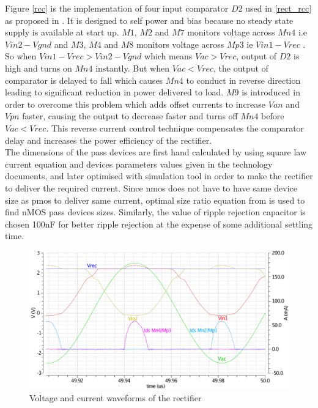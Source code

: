 \documentclass[12pt,a4paper,UKenglish]{article}
\begin{document}
Figure \ref{rcc}  is the implementation of four input comparator $D2$ used in \ref{rect_rcc} as proposed in \cite{rectrcc}. It is designed to self power and bias because no steady state supply is available at start up. $M1$, $M2$ and $M7$ monitors voltage across $Mn4$ i.e $Vin2 - Vgnd$ and $M3$, $M4$ and $M8$ monitors voltage across $Mp3$ ie $Vin1 - Vrec$ . So when $Vin1 - Vrec > Vin2 - Vgnd$ which means $Vac > Vrec$, output of $D2$ is high and turns on $Mn4$ instantly. But when $Vac < Vrec$, the output of comparator is delayed to fall which causes $Mn4$ to conduct in reverse direction leading to significant reduction in power delivered to load. $M9$ is introduced in order to overcome this problem which adds offset currents to increase $Van$ and $Vpn$ faster, causing the output to decrease faster and turns off $Mn4$ before $Vac < Vrec$. This reverse current control technique compensates the comparator delay and increases the power efficiency of the rectifier. \\

The dimensions of the pass devices are first hand calculated by using square law current equation and devices parameters values given in the technology documents, and later optimised with simulation tool in order to make the rectifier to deliver the required current. Since \acrshort{nmos} does not have to have same device size as \acrshort{pmos} to deliver same current, optimal size ratio equation from \cite{rectsize} is used to find nMOS pass devices sizes.
Similarly, the value of ripple rejection capacitor is chosen 100nF for better ripple rejection at the expense of some additional settling time.

\begin{figure}[htbp] %
   \centering
   \includegraphics[width=.8\textwidth]{img/rect_output.pdf} 
   \caption{Voltage and current waveforms of the rectifier}
   \label{rect_plot}
\end{figure}
\end{document}
